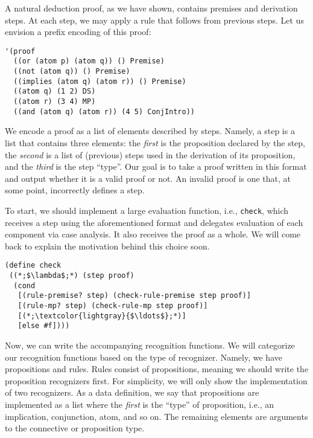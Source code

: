 A natural deduction proof, as we have shown, contains premises and derivation steps. At each step, we may apply a rule that follows from previous steps. Let us envision a prefix encoding of this proof:
\begin{cl}[]{}\begin{lstlisting}[language=MySOutput]
'(proof 
  ((or (atom p) (atom q)) () Premise)
  ((not (atom q)) () Premise)
  ((implies (atom q) (atom r)) () Premise)
  ((atom q) (1 2) DS)
  ((atom r) (3 4) MP)
  ((and (atom q) (atom r)) (4 5) ConjIntro))
\end{lstlisting}\end{cl}
We encode a proof as a list of elements described by steps. Namely, a step is a list that contains three elements: the \textit{first} is the proposition declared by the step, the \textit{second} is a list of (previous) steps used in the derivation of its proposition, and the \textit{third} is the step ``type''. Our goal is to take a proof written in this format and output whether it is a valid proof or not. An invalid proof is one that, at some point, incorrectly defines a step.

To start, we should implement a large evaluation function, i.e., \texttt{check}, which receives a step using the aforementioned format and delegates evaluation of each component via case analysis. It also receives the proof as a whole. We will come back to explain the motivation behind this choice soon.
\begin{cl}[]{}\begin{lstlisting}[language=MyScheme]
(define check
 ((*;$\lambda$;*) (step proof)
  (cond
   [(rule-premise? step) (check-rule-premise step proof)]
   [(rule-mp? step) (check-rule-mp step proof)]
   [(*;\textcolor{lightgray}{$\ldots$};*)]
   [else #f])))
\end{lstlisting}\end{cl}

Now, we can write the accompanying recognition functions. We will categorize our recognition functions based on the type of recognizer. Namely, we have propositions and rules. Rules consist of propositions, meaning we should write the proposition recognizers first. For simplicity, we will only show the implementation of two recognizers. As a data definition, we say that propositions are implemented as a list where the \textit{first} is the ``type'' of proposition, i.e., an implication, conjunction, atom, and so on. The remaining elements are arguments to the connective or proposition type. 

